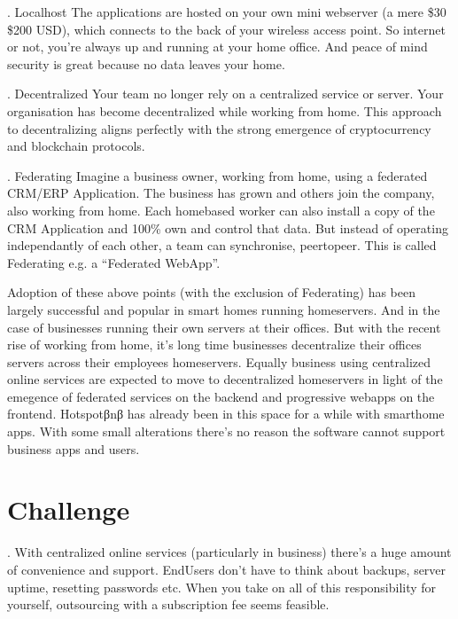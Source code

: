 \documentclass[letterpaper,10pt,openany,oneside,english]{sphinxmanual}
\begin{document}
. Localhost
The applications are hosted on your own mini webserver (a mere \$30 \sphinxhyphen{} \$200 USD), which connects to the back of your wireless access point.
So internet or not, you’re always up and running at your home office. And peace of mind security is great because no data leaves your home.

. Decentralized
Your team no longer rely on a centralized service or server. Your organisation has become de\sphinxhyphen{}centralized while working from home.
This approach to decentralizing aligns perfectly with the strong emergence of cryptocurrency and blockchain protocols.

. Federating
Imagine a business owner, working from home, using a federated CRM/ERP Application.
The business has grown and others join the company, also working from home.
Each home\sphinxhyphen{}based worker can also install a copy of the CRM Application and 100\% own and control that data.
But instead of operating independantly of each other, a team can synchronise, peer\sphinxhyphen{}to\sphinxhyphen{}peer.
This is called Federating e.g. a “Federated WebApp”.

\sphinxAtStartPar
Adoption of these above points (with the exclusion of Federating) has been largely successful and popular in smart homes running homeservers.
And in the case of businesses running their own servers at their offices.
But with the recent rise of working from home, it’s long time businesses decentralize their offices servers across their employees homeservers.
Equally business using centralized online services are expected to move to decentralized homeservers in light of the emegence of federated services on the backend and progressive webapps on the front\sphinxhyphen{}end.
Hotspotβnβ has already been in this space for a while with smarthome apps. With some small alterations there’s no reason the software cannot support business apps and users.


\section{Challenge}
\label{\detokenize{executivesummary:challenge}}
. With centralized online services (particularly in business) there’s a huge amount of convenience and support. End\sphinxhyphen{}Users don’t have to think about backups, server uptime, resetting passwords etc.
When you take on all of this responsibility for yourself, outsourcing with a subscription fee seems feasible.
\end{document}
